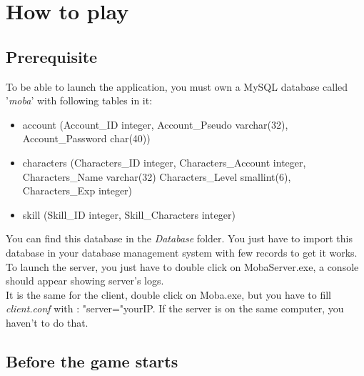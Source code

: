 \documentclass{scrreprt}
\begin{document}
		  \part{How to play}
		  \chapter{Prerequisite}
		  To be able to launch the application, you must own a MySQL database called '\emph{moba}' with following tables in it:
		  \begin{itemize}
		  \item{account (Account\_ID integer, Account\_Pseudo varchar(32), Account\_Password char(40))}
		  \item{characters (Characters\_ID integer, Characters\_Account integer, Characters\_Name varchar(32) Characters\_Level smallint(6), Characters\_Exp integer)}
		  \item{skill (Skill\_ID integer, Skill\_Characters integer)}
		  \end{itemize}

		  You can find this database in the \emph{Database} folder. You just have to import this database in your database management system with few records to get it works.\\

		  To launch the server, you just have to double click on MobaServer.exe, a console should appear showing server's logs.\\
		  It is the same for the client, double click on Moba.exe, but  you have to fill \emph{client.conf} with : "server="yourIP. If the server is on the same computer, you haven't to do that.

		  \chapter{Before the game starts}
\end{document}
